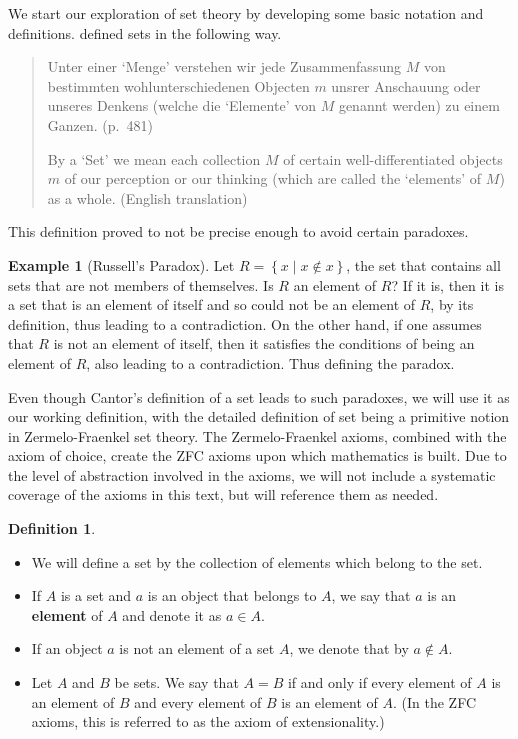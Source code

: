 \documentclass[
]{book}
\theoremstyle{definition}
\newtheorem{definition}{Definition}[chapter]
\theoremstyle{definition}
\newtheorem{example}{Example}[chapter]
\theoremstyle{definition}
\theoremstyle{remark}
\begin{document}
We start our exploration of set theory by developing some basic notation and definitions. \citet{Cantor} defined sets in the following way.

\begin{quote}
Unter einer `Menge' verstehen wir jede Zusammenfassung \(M\) von bestimmten wohlunterschiedenen Objecten \(m\) unsrer Anschauung oder unseres Denkens (welche die `Elemente' von \(M\) genannt werden) zu einem Ganzen. (p.~481)

By a `Set' we mean each collection \(M\) of certain well-differentiated objects \(m\) of our perception or our thinking (which are called the `elements' of \(M\)) as a whole. (English translation)
\end{quote}

This definition proved to not be precise enough to avoid certain paradoxes.

\begin{example}[Russell's Paradox]
\protect\hypertarget{exm:unnamed-chunk-5}{}{\label{exm:unnamed-chunk-5} {} } Let \(R= \left\{ x \middle \vert x\notin x\right\}\), the set that contains all sets that are not members of themselves. Is \(R\) an element of \(R\)? If it is, then it is a set that is an element of itself and so could not be an element of \(R\), by its definition, thus leading to a contradiction. On the other hand, if one assumes that \(R\) is not an element of itself, then it satisfies the conditions of being an element of \(R\), also leading to a contradiction. Thus defining the paradox.
\end{example}

Even though Cantor's definition of a set leads to such paradoxes, we will use it as our working definition, with the detailed definition of set being a primitive notion in Zermelo-Fraenkel set theory. The Zermelo-Fraenkel axioms, combined with the axiom of choice, create the ZFC axioms upon which mathematics is built. Due to the level of abstraction involved in the axioms, we will not include a systematic coverage of the axioms in this text, but will reference them as needed.

\begin{definition}
\protect\hypertarget{def:unnamed-chunk-6}{}{\label{def:unnamed-chunk-6} }

\begin{itemize}
\item
  We will define a set by the collection of elements which belong to the set.
\item
  If \(A\) is a set and \(a\) is an object that belongs to \(A\), we say that \(a\) is an \textbf{element} of \(A\) and denote it as \(a\in A\).
\item
  If an object \(a\) is not an element of a set \(A\), we denote that by \(a \notin A\).
\item
  Let \(A\) and \(B\) be sets. We say that \(A=B\) if and only if every element of \(A\) is an element of \(B\) and every element of \(B\) is an element of \(A\). (In the ZFC axioms, this is referred to as the axiom of extensionality.)
\end{itemize}
\end{definition}
\end{document}
